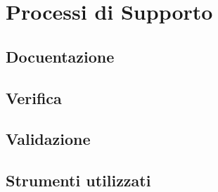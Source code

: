 \section{Processi di Supporto}
	\subsection{Docuentazione}
	\subsection{Verifica}
	\subsection{Validazione}
	\subsection{Strumenti utilizzati}
	